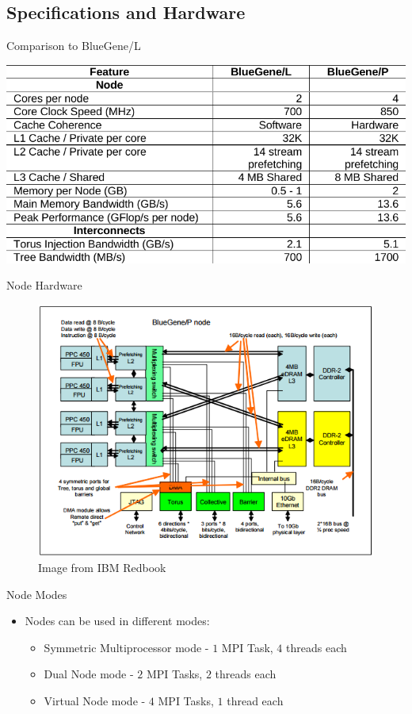 \documentclass{beamer}
\begin{document}
\subsection{Specifications and Hardware}
\begin{frame}{Comparison to BlueGene/L}
\begin{center}
\includegraphics[scale=0.5]{figs/sysconfig.png}
\end{center}
\end{frame}

\begin{frame}{Node Hardware}
\begin{figure}
\begin{center}
\includegraphics[scale=0.5]{figs/computenode.png}
\caption{Image from IBM Redbook \cite{ibm}}
\end{center}
\end{figure}
\end{frame}

\begin{frame}{Node Modes}
\begin{itemize}
\item Nodes can be used in different modes:
\begin{itemize}
    \item Symmetric Multiprocessor mode - $1$ MPI Task, $4$ threads each
    \item Dual Node mode - $2$ MPI Tasks, $2$ threads each
    \item Virtual Node mode - $4$ MPI Tasks, $1$ thread each
\end{itemize}
\end{itemize}
\end{frame}
\end{document}
